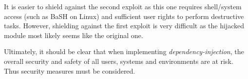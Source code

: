 It is easier to shield against the second exploit as this one requires shell/system access (such as BaSH on Linux) and sufficient user rights to perform destructive tasks.
However, shielding against the first exploit is very difficult as the hijacked module most likely seems like the original one.

Ultimately, it should be clear that when implementing \textit{dependency-injection}, the overall security and safety of all users, systems and environments are at risk. 
Thus security measures must be considered.